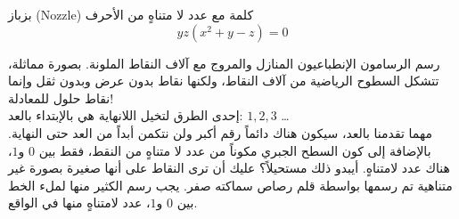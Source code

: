 \begin{surferPage}[بزباز]{بزباز (Nozzle)}
 كلمة مع عدد لا متناهٍ من الأحرف \\
\smallskip
\[y z (x^2	+ y - z) = 0\]

\vspace{0.3cm}
رسم الرسامون الإنطباعيون المنازل والمروج مع آلاف النقاط الملونة. بصورة مماثلة، تتشكل السطوح الرياضية من آلاف النقاط، ولكنها نقاط بدون عرض وبدون  ثقل وإنما نقاط حلول للمعادلة! \\

\vspace{0.3cm}
إحدى الطرق لتخيل اللانهاية هي بالإبتداء بالعد:
$ 1,2,3 $ \dots
\\
مهما تقدمنا بالعد، سيكون هناك دائماً رقم أكبر ولن نتكمن أبداً من العد حتى النهاية.
\vspace{0.3cm}
بالإضافة إلى كون السطح الجبري مكوناً من عدد لا متناهٍ من النقط، فقط بين $0$ و$1$، هناك عدد لامتناهٍ. أيبدو ذلك مستحيلاً؟ عليك أن ترى النقاط على أنها صغيرة بصورة غير متناهية تم رسمها بواسطة قلم رصاص سماكته صفر. يجب رسم الكثير منها لملء الخط بين $0$ و$1$، عدد لامتناهٍ منها في الواقع.
\end{surferPage}
